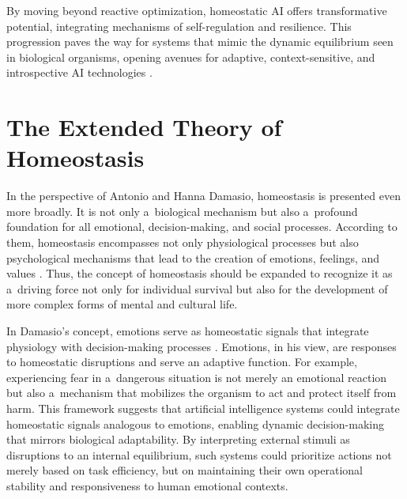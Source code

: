 By moving beyond reactive optimization, homeostatic AI offers transformative potential, integrating mechanisms of self-regulation and resilience. This progression paves the way for systems that mimic the dynamic equilibrium seen in biological organisms, opening avenues for adaptive, context-sensitive, and introspective AI technologies 
\parencite[][]{tegmark_life_2018}.%




\section*{The Extended Theory of Homeostasis}

In the perspective of Antonio and Hanna Damasio, homeostasis is presented even more broadly. It is not only a~biological mechanism but also a~profound foundation for all emotional, decision-making, and social processes. According to them, homeostasis encompasses not only physiological processes but also psychological mechanisms that lead to the creation of emotions, feelings, and values 
\parencites[][]{korn_maintaining_2015}[][]{damasio_homeostatic_2022}. %
 Thus, the concept of homeostasis should be expanded to recognize it as a~driving force not only for individual survival but also for the development of more complex forms of mental and cultural life.



In Damasio's concept, emotions serve as homeostatic signals that integrate physiology with decision-making processes 
\parencite[][]{damasio_nature_2013}. %
 Emotions, in his view, are responses to homeostatic disruptions and serve an adaptive function. For example, experiencing fear in a~dangerous situation is not merely an emotional reaction but also a~mechanism that mobilizes the organism to act and protect itself from harm. This framework suggests that artificial intelligence systems could integrate homeostatic signals analogous to emotions, enabling dynamic decision-making that mirrors biological adaptability. By interpreting external stimuli as disruptions to an internal equilibrium, such systems could prioritize actions not merely based on task efficiency, but on maintaining their own operational stability and responsiveness to human emotional contexts.



